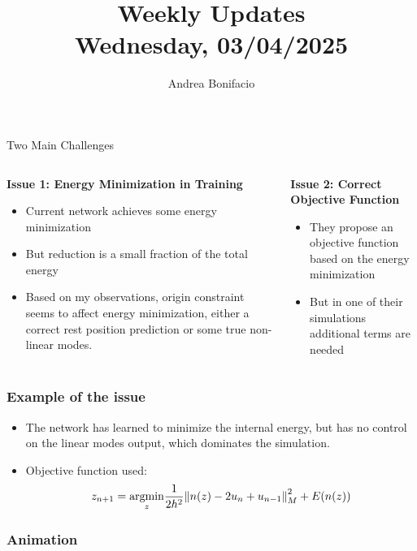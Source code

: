 \documentclass{beamer}
\title{Weekly Updates\\
\tiny{Wednesday, 03/04/2025}}
\author{Andrea Bonifacio}
\date{}
\DeclareMathOperator{\argmin}{argmin}
\begin{document}
\begin{frame}
\titlepage
\end{frame}


\begin{frame}{Two Main Challenges}
    \begin{columns}
        \begin{column}{0.48\textwidth}
            \textbf{Issue 1: Energy Minimization in Training}
            \begin{itemize}
                \item Current network achieves some energy minimization
                \item But reduction is a small fraction of the total energy
                \item Based on my observations, origin constraint seems to affect energy minimization, either a correct rest position prediction or some true non-linear modes. 
            \end{itemize}
        \end{column}
        
        \begin{column}{0.48\textwidth}
            \textbf{Issue 2: Correct Objective Function}
            \begin{itemize}
                \item They propose an objective function based on the energy minimization
                \item But in one of their simulations additional terms are needed
            \end{itemize}
        \end{column}
    \end{columns}
\end{frame}


\begin{frame}
    \frametitle{Example of the issue}
    \begin{itemize}
        \item The network has learned to minimize the internal energy, but has no control on the linear modes output, which dominates the simulation.
        \item Objective function used:
        \[
              z_{n+1} = \underset{z}{\argmin}  \frac{1}{2h^2} \norm{n(z) - 2u_n + u_{n-1}}^2_M + E(n(z))
        \]
    \end{itemize}
\end{frame}

\begin{frame}
    \frametitle{Animation}
    \begin{center}
    \end{center}
\end{frame}
\end{document}
